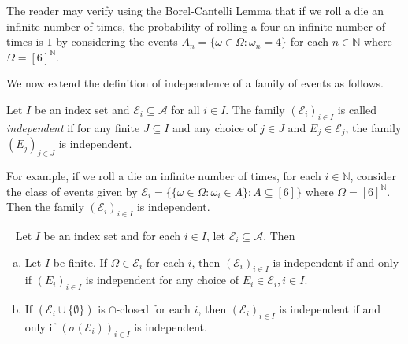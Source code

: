 The reader may verify using the Borel-Cantelli Lemma that if we roll a die an infinite number of times, the probability of rolling a four an infinite number of times is $1$ by considering the events $A_n = \{\omega\in\Omega:\omega_n=4\}$ for each $n\in\mathbb{N}$ where $\Omega=[6]^\mathbb{N}$.

\vspace{2mm}
We now extend the definition of independence of a family of events as follows.

\begin{definition}
\label{independence of classes of events}
    Let $I$ be an index set and $\mathcal{E}_i\subseteq\mathcal{A}$ for all $i\in I$. The family $(\mathcal{E}_i)_{i\in I}$ is called \textit{independent} if for any finite $J\subseteq I$ and any choice of $j\in J$ and $E_j\in\mathcal{E}_j$, the family $(E_j)_{j\in J}$ is independent.
\end{definition}

For example, if we roll a die an infinite number of times, for each $i\in\mathbb{N}$, consider the class of events given by $\mathcal{E}_i=\{\{\omega\in\Omega:\omega_i\in A\}:A\subseteq[6]\}$
where $\Omega=[6]^\mathbb{N}$. Then the family $(\mathcal{E}_i)_{i\in I}$ is independent.

\begin{theorem}
\label{independent set classes subset}
~
    Let $I$ be an index set and for each $i\in I$, let $\mathcal{E}_i\subseteq \mathcal{A}$. Then
    \begin{enumerate}[(a)]
        \item Let $I$ be finite. If $\Omega\in\mathcal{E}_i$ for each $i$, then $(\mathcal{E}_i)_{i\in I}$ is independent if and only if $(E_i)_{i\in I}$ is independent for any choice of $E_i\in\mathcal{E}_i, i\in I$.
        
        \item If $(\mathcal{E}_i\cup\{\emptyset\})$ is $\cap$-closed for each $i$, then $(\mathcal{E}_i)_{i\in I}$ is independent if and only if $(\sigma(\mathcal{E}_i))_{i\in I}$ is independent.
        
    \end{enumerate}
\end{theorem}

